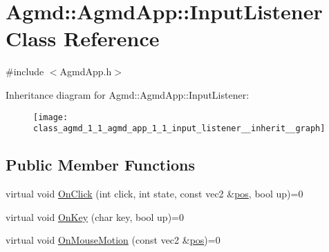 \hypertarget{class_agmd_1_1_agmd_app_1_1_input_listener}{\section{Agmd\+:\+:Agmd\+App\+:\+:Input\+Listener Class Reference}
\label{class_agmd_1_1_agmd_app_1_1_input_listener}
}


{\ttfamily \#include $<$Agmd\+App.\+h$>$}



Inheritance diagram for Agmd\+:\+:Agmd\+App\+:\+:Input\+Listener\+:\nopagebreak
\begin{figure}[H]
\begin{center}
\leavevmode
\texttt{[image: class\_agmd\_1\_1\_agmd\_app\_1\_1\_input\_listener\_\_inherit\_\_graph]}
\end{center}
\end{figure}
\subsection*{Public Member Functions}
\begin{DoxyCompactItemize}
\item 
virtual void \hyperlink{class_agmd_1_1_agmd_app_1_1_input_listener_a01156fd9561c7234122cc5b55074e870}{On\+Click} (int click, int state, const vec2 \&\hyperlink{_examples_2_planet_2_app_8cpp_aa8a1c0491559faca4ebd0881575ae7f0}{pos}, bool up)=0
\item 
virtual void \hyperlink{class_agmd_1_1_agmd_app_1_1_input_listener_aa4679bd12478ade026710836dcea291e}{On\+Key} (char key, bool up)=0
\item 
virtual void \hyperlink{class_agmd_1_1_agmd_app_1_1_input_listener_a1f4ef5ac31da58ae90d2c7b37243a5b4}{On\+Mouse\+Motion} (const vec2 \&\hyperlink{_examples_2_planet_2_app_8cpp_aa8a1c0491559faca4ebd0881575ae7f0}{pos})=0
\end{DoxyCompactItemize}


